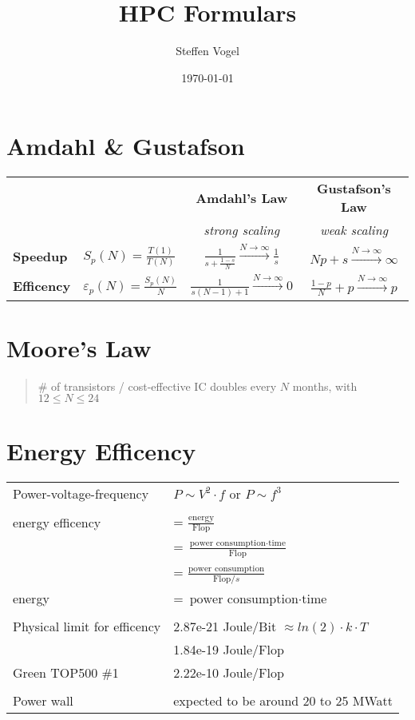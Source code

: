 \documentclass[11pt]{article}
\title{HPC Formulars}
\author{Steffen Vogel}
\date{\today}
\begin{document}
\section{Amdahl \& Gustafson}

\begin{tabular}{ l l | c c }

	&  & \textbf{Amdahl's Law} & \textbf{Gustafson's Law} \\
	&	 & \textit{strong scaling}	& \textit{weak scaling} \\
	\hline
	\textbf{Speedup} & \( S_p(N) = \frac{T(1)}{T(N)} \) & \( \frac{1}{s + \frac{1 - s}{N}} \xrightarrow{N \rightarrow \infty} \frac{1}{s} \) & \( Np + s \xrightarrow{N \rightarrow \infty} \infty \) \\
	\textbf{Efficency} & \( \varepsilon_p(N) = \frac{S_p(N)}{N} \) & \( \frac{1}{s (N-1) + 1} \xrightarrow{N \rightarrow \infty} 0 \) & \( \frac{1 - p}{N} + p \xrightarrow{N \rightarrow \infty} p \) \\
\end{tabular}

\section{Moore's Law}

\begin{quote}
	\# of transistors / cost-effective IC doubles every $N$ months, with $12 \leq N \leq 24$
\end{quote}

\section{Energy Efficency}

\begin{tabular}{ p{7cm} l }
	Power-voltage-frequency & \( P \sim V^2 \cdot f \) or \( P \sim f^3 \) \\
	& \\
	energy efficency & = \( \frac{\text{energy}}{\text{Flop}} \) \\
			 & = \( \frac{\text{power consumption} \cdot \text{time}}{\text{Flop}} \) \\
			 & = \( \frac{\text{power consumption}}{\text{Flop}/s} \) \\
	energy		 & = \( \text{power consumption} \cdot \text{time} \) \\
	& \\
	Physical limit for efficency 	& 2.87e-21 Joule/Bit \( \approx ln(2) \cdot k \cdot T \) \\
					& 1.84e-19 Joule/Flop \\
	Green TOP500 \#1		& 2.22e-10 Joule/Flop \\
	& \\
	Power wall			& expected to be around 20 to 25 MWatt \\
\end{tabular}
\end{document}
